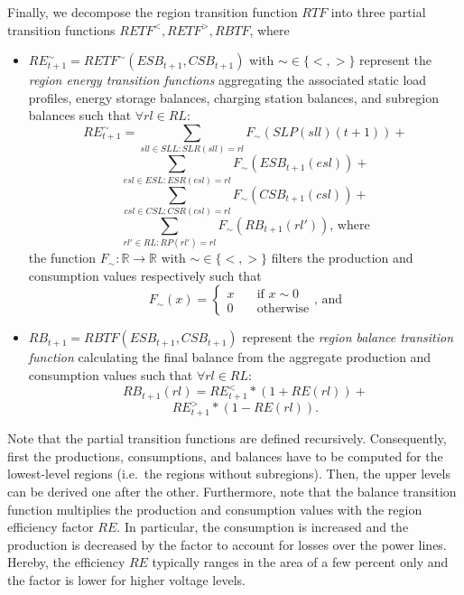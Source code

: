 Finally, we decompose the region transition function $RTF$ into three partial transition functions $RETF^<,RETF^>,RBTF$, where
\begin{itemize}
	\item $RE_{t+1}^\sim = RETF^\sim(ESB_{t+1}, CSB_{t+1})$ with $\sim \in \{<,>\}$ represent the \textit{region energy transition functions} aggregating the associated static load profiles, energy storage balances, charging station balances, and subregion balances such that $\forall rl \in RL:$
	\[
		RE_{t+1}^\sim = \sum_{sll \in SLL: SLR(sll) = rl} F_\sim(SLP(sll)(t+1)) +
		\]
		\[
		\sum_{esl \in ESL: ESR(esl) = rl} F_\sim(ESB_{t+1}(esl)) +
		\]
		\[
		\sum_{csl \in CSL: CSR(csl) = rl} F_\sim(CSB_{t+1}(csl)) +
		\]
		\[
		\sum_{rl' \in RL: RP(rl') = rl} F_\sim(RB_{t+1}(rl')) \textrm{, where}
	\]
	the function $F_\sim: \mathbb{R} \rightarrow \mathbb{R}$ with $\sim \in \{<,>\}$ filters the production and consumption values respectively such that
	\[
		F_\sim(x) = \begin{cases}
			x & \quad \textrm{if } x \sim 0 \\
			0 & \quad \textrm{otherwise}
		\end{cases}
		\textrm{, and}
	\]
	\item $RB_{t+1} = RBTF(ESB_{t+1}, CSB_{t+1})$ represent the \textit{region balance transition function} calculating the final balance from the aggregate production and consumption values such that $\forall rl \in RL:$
	\[
		RB_{t+1}(rl) = RE_{t+1}^< * (1 + RE(rl)) +
	\]
	\[
		RE_{t+1}^> * (1 - RE(rl)) \textrm{.}
	\]
\end{itemize}
Note that the partial transition functions are defined recursively. Consequently, first the productions, consumptions, and balances have to be computed for the lowest-level regions (i.e.\ the regions without subregions). Then, the upper levels can be derived one after the other. Furthermore, note that the balance transition function multiplies the production and consumption values with the region efficiency factor $RE$. In particular, the consumption is increased and the production is decreased by the factor to account for losses over the power lines. Hereby, the efficiency $RE$ typically ranges in the area of a few percent only and the factor is lower for higher voltage levels.
